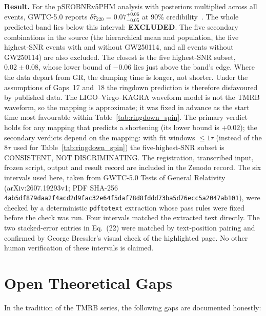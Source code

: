\documentclass[11pt,a4paper]{article}
\begin{document}
\noindent\textbf{Result.} For the pSEOBNRv5PHM analysis with posteriors multiplied
across all events, GWTC-5.0 reports $\delta\hat\tau_{220} = 0.07^{+0.06}_{-0.05}$ at
90\% credibility~\cite{GWTC5TGR}. The whole predicted band lies below this interval:
\textbf{EXCLUDED}. The five secondary combinations in the source (the hierarchical mean
and population, the five highest-SNR events with and without GW250114, and all events
without GW250114) are also excluded. The closest is the five highest-SNR subset,
$0.02 \pm 0.08$, whose lower bound of $-0.06$ lies just above the band's edge. Where the
data depart from GR, the damping time is longer, not shorter. Under the assumptions of
Gaps~17 and~18 the ringdown prediction is therefore disfavoured by published data. The
LIGO--Virgo--KAGRA waveform model is not the TMRB waveform, so the mapping is approximate;
it was fixed in advance as the start time most favourable within Table~\ref{tab:ringdown_spin}.
The primary verdict holds for any mapping that predicts a shortening (its lower bound is $+0.02$); the secondary verdicts depend on the mapping: with fit windows $\leq 1\tau$ (instead of the $8\tau$ used for Table~\ref{tab:ringdown_spin}) the five-highest-SNR subset is CONSISTENT, NOT DISCRIMINATING.
The registration,
transcribed input, frozen script, output and result record are included in the Zenodo
record.
The six intervals used here, taken from GWTC-5.0 Tests of General Relativity
(arXiv:2607.19293v1; PDF SHA-256
\texttt{4ab5df879daa2f4acd2d9fac32e64f5daf78d8fddd73ba5d76ecc5a2047ab101}),
were checked by a deterministic \texttt{pdftotext} extraction whose pass rules
were fixed before the check was run. Four intervals matched the extracted text directly.
The two stacked-error entries in Eq.~(22) were matched by text-position pairing
and confirmed by George Bressler's visual check of the highlighted page.
No other human verification of these intervals is claimed.

\section{Open Theoretical Gaps}
\label{sec:gaps}

In the tradition of the TMRB series, the following gaps are documented honestly:
\end{document}
